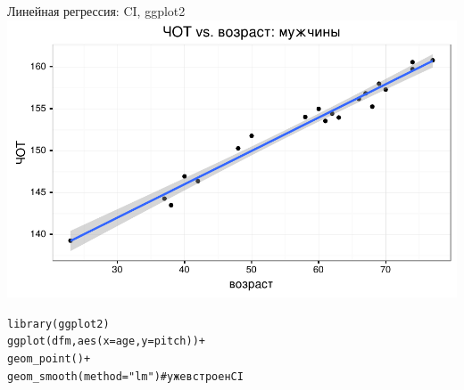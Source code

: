 \begin{frame}{Линейная регрессия: CI, ggplot2}
\includegraphics[width=0.95\linewidth]{linearggplot.pdf}
\scriptsize
\begin{alltt}
library(ggplot2)\\
ggplot(dfm, aes(x=age, y = pitch))+\\
  geom\_point()+\\
\alert{geom\_smooth(method = "lm") \hfill \# уже встроен CI}\\
\end{alltt}
\normalsize
\end{frame}
